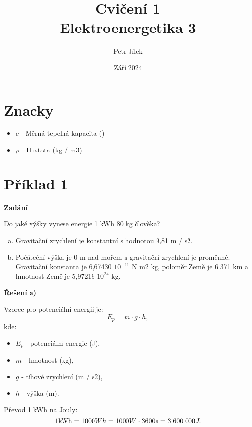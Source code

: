 \documentclass{article}
\title{\textbf{Cvičení 1}\\Elektroenergetika 3}
\author{Petr Jílek}
\date{Září 2024}
\begin{document}



\maketitle

\tableofcontents



\section*{Znacky}

\begin{itemize}
    \item $c$ - Měrná tepelná kapacita (\ueqJperKGperK)
    \item $\rho$ - Hustota (kg / m3)
\end{itemize}

\newpage



\section*{Příklad 1}

\textbf{Zadání}

Do jaké výšky vynese energie 1 kWh 80 kg člověka?

\begin{enumerate}[a)]
    \item Gravitační zrychlení je konstantní s hodnotou 9,81 m / s2.
    \item Počáteční výška je 0 m nad mořem a gravitační zrychlení je proměnné. Gravitační konstanta je 6,67430 \myFS $10^{-11}$ N \myFS m2 \myFS kg, poloměr Země je 6 371 km a hmotnost Země je 5,97219 \myFS $10^{24}$ kg.
\end{enumerate}

\textbf{Řešení a)}

Vzorec pro potenciální energii je:
$$
    E_p = m \cdot g \cdot h,
$$
kde:
\begin{itemize}
    \item $E_p$ - potenciální energie (J),
    \item $m$ - hmotnost (kg),
    \item $g$ - tíhové zrychlení (m / s2),
    \item $h$ - výška (m).
\end{itemize}

Převod 1 kWh na Jouly:
$$
    1 \textrm{kWh} = 1000 Wh = 1000 W \cdot 3600 s = 3 \; 600 \; 000 J.
$$
\end{document}
